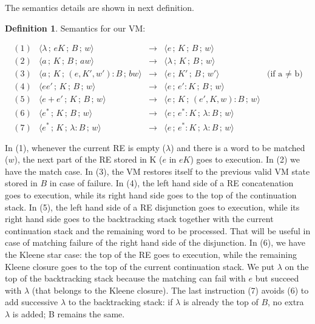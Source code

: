 \documentclass[oneside,12pt]{scrbook}
\theoremstyle{definition}
\theoremstyle{plain}
\theoremstyle{definition}
\newtheorem{Definition}{Definition}
\begin{document}
The semantics details are shown in next definition.

\begin{Definition}\label{definition:MachineSemantis}
	Semantics for our VM:
	
	\[
		\begin{array}{lrclr}
		(1) & \langle \lambda \,;\, eK\,;\, B\,;\, w\rangle & \rightarrow & \langle e \,;\,K\,;\,B\,;\,w\rangle & \\
		(2) & \langle a \,;\, K \,;\, B\,;\,aw \rangle & \rightarrow & \langle \lambda \,;\, K \,;\, B\,;\, w\rangle & \\
		(3) & \langle a \,;\, K \,;\, (e,K',w'):B \,;\, bw \rangle & \rightarrow & \langle e \,;\, K' \,;\, B \,;\, w' \rangle & \text{(if a $\neq$ b)}\\
		(4) & \langle ee' \,;\, K \,;\, B \,;\, w \rangle & \rightarrow & \langle e \,;\, e':K \,;\, B \,;\, w \rangle & \\
		(5) & \langle e+e' \,;\, K \,;\, B \,;\, w \rangle & \rightarrow & \langle e \,;\, K \,;\, (e',K,w): B \,;\, w \rangle &\\
		(6) & \langle e^* \,;\, K \,;\, B \,;\, w \rangle & \rightarrow & \langle e \,;\, e^*:K \,;\, \lambda:B \,;\, w \rangle & \\
		(7) & \langle e^* \,;\, K \,;\, \lambda : B \,;\, w \rangle & \rightarrow & \langle e \,;\, e^*:K \,;\, \lambda:B \,;\, w \rangle & \\\\
		\end{array}
	\]
	In (1), whenever the current RE is empty ($\lambda$) and there is a word to be matched ($w$), the next part of the RE stored in K ($e$ in $eK$) goes to execution. In (2) we have the match case. In (3), the VM restores itself to the previous valid VM state stored in $B$ in case of failure. In (4), the left hand side of a RE concatenation goes to execution, while its right hand side goes to the top of the continuation stack. In (5), the left hand side of a RE disjunction goes to execution, while its right hand side goes to the backtracking stack together with the current continuation stack and the remaining word to be processed. That will be useful in case of matching failure of the right hand side of the disjunction. In (6), we have the Kleene star case: the top of the RE goes to execution, while the remaining Kleene closure goes to the top of the current continuation stack. We put $\lambda$ on the top of the backtracking stack because the matching can fail with $e$ but succeed with $\lambda$ (that belongs to the Kleene closure). The last instruction (7) avoids (6) to add successive $\lambda$ to the backtracking stack: if $\lambda$ is already the top of $B$, no extra $\lambda$ is added; B remains the same.
\end{Definition}
\end{document}
